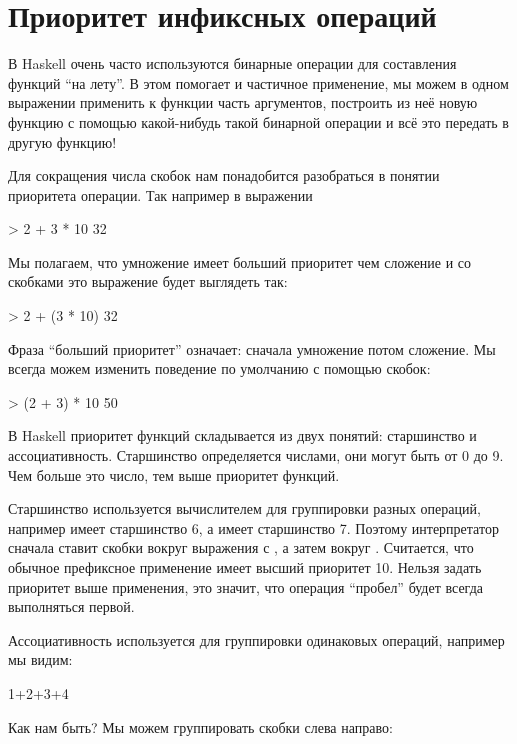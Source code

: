 \section{Приоритет инфиксных операций}

В Haskell очень часто используются бинарные операции для составления
функций ``на лету''. В этом помогает и частичное применение, мы можем в
одном выражении применить к функции часть аргументов, построить из неё
новую функцию с помощью какой-нибудь такой бинарной операции и всё это
передать в другую функцию!

Для сокращения числа скобок нам понадобится разобраться в понятии
приоритета операции. Так например в выражении


\begin{code}
> 2 + 3 * 10
32
\end{code}

Мы полагаем, что умножение имеет больший приоритет чем сложение и со
скобками это выражение будет выглядеть так:


\begin{code}
> 2 + (3 * 10)
32
\end{code}

Фраза ``больший приоритет'' означает: сначала умножение потом сложение.
Мы всегда можем изменить поведение по умолчанию с помощью скобок:


\begin{code}
> (2 + 3) * 10
50
\end{code}

В Haskell приоритет функций складывается из двух понятий: старшинство и
ассоциативность. Старшинство определяется числами, они могут быть от 0
до 9. Чем больше это число, тем выше приоритет функций.

Старшинство используется вычислителем для группировки разных операций,
например \In{(+)} имеет старшинство 6, а \In{(*)} имеет старшинство 7.
Поэтому интерпретатор сначала ставит скобки вокруг выражения с \In{(*)},
а затем вокруг \In{(+)}. Считается, что обычное префиксное применение
имеет высший приоритет 10. Нельзя задать приоритет выше применения, это
значит, что операция ``пробел'' будет всегда выполняться первой.

Ассоциативность используется для группировки одинаковых операций,
например мы видим:


\begin{code}
1+2+3+4
\end{code}

Как нам быть? Мы можем группировать скобки слева направо:


